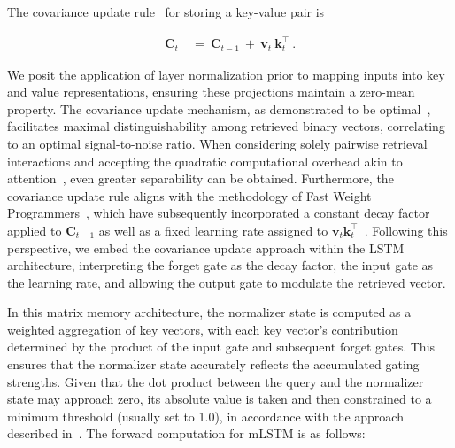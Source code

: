 The covariance update rule~\citep{Sejnowski:77,Dayan:91} for storing a key-value pair is

\begin{align}
\mathbf{C}_t \ &= \ \mathbf{C}_{t-1} \ + \ \mathbf{v}_{t} \ \mathbf{k}_t^\top \ .
\end{align}

We posit the application of layer normalization prior to mapping inputs into key and value representations, ensuring these projections maintain a zero-mean property. The covariance update mechanism, as demonstrated to be optimal~\citep{Dayan:91}, facilitates maximal distinguishability among retrieved binary vectors, correlating to an optimal signal-to-noise ratio. When considering solely pairwise retrieval interactions and accepting the quadratic computational overhead akin to attention~\citep{Krotov:16,Krotov:17,Ramsauer:21}, even greater separability can be obtained. Furthermore, the covariance update rule aligns with the methodology of Fast Weight Programmers~\citep{Schmidhuber:92ncfastweights,Schlag:21}, which have subsequently incorporated a constant decay factor applied to $\mathbf{C}_{t-1}$ as well as a fixed learning rate assigned to 
$\mathbf{v}_{t} \mathbf{k}_t ^\top$~\citep{Ba:16}.
Following this perspective, we embed the covariance update approach within the LSTM architecture, interpreting the forget gate as the decay factor, the input gate as the learning rate, and allowing the output gate to modulate the retrieved vector.

In this matrix memory architecture, the normalizer state is computed as a weighted aggregation of key vectors, with each key vector's contribution determined by the product of the input gate and subsequent forget gates. This ensures that the normalizer state accurately reflects the accumulated gating strengths. Given that the dot product between the query and the normalizer state may approach zero, its absolute value is taken and then constrained to a minimum threshold (usually set to 1.0), in accordance with the approach described in~\citep{Sun:23arxiv}. The forward computation for mLSTM is as follows:

